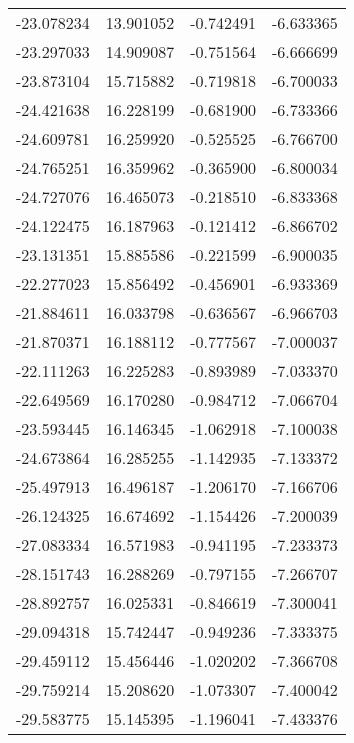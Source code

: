 \begin{tabular}{rrrr}
      -23.078234 &        13.901052 &   -0.742491 &  -6.633365 \\
      -23.297033 &        14.909087 &   -0.751564 &  -6.666699 \\
      -23.873104 &        15.715882 &   -0.719818 &  -6.700033 \\
      -24.421638 &        16.228199 &   -0.681900 &  -6.733366 \\
      -24.609781 &        16.259920 &   -0.525525 &  -6.766700 \\
      -24.765251 &        16.359962 &   -0.365900 &  -6.800034 \\
      -24.727076 &        16.465073 &   -0.218510 &  -6.833368 \\
      -24.122475 &        16.187963 &   -0.121412 &  -6.866702 \\
      -23.131351 &        15.885586 &   -0.221599 &  -6.900035 \\
      -22.277023 &        15.856492 &   -0.456901 &  -6.933369 \\
      -21.884611 &        16.033798 &   -0.636567 &  -6.966703 \\
      -21.870371 &        16.188112 &   -0.777567 &  -7.000037 \\
      -22.111263 &        16.225283 &   -0.893989 &  -7.033370 \\
      -22.649569 &        16.170280 &   -0.984712 &  -7.066704 \\
      -23.593445 &        16.146345 &   -1.062918 &  -7.100038 \\
      -24.673864 &        16.285255 &   -1.142935 &  -7.133372 \\
      -25.497913 &        16.496187 &   -1.206170 &  -7.166706 \\
      -26.124325 &        16.674692 &   -1.154426 &  -7.200039 \\
      -27.083334 &        16.571983 &   -0.941195 &  -7.233373 \\
      -28.151743 &        16.288269 &   -0.797155 &  -7.266707 \\
      -28.892757 &        16.025331 &   -0.846619 &  -7.300041 \\
      -29.094318 &        15.742447 &   -0.949236 &  -7.333375 \\
      -29.459112 &        15.456446 &   -1.020202 &  -7.366708 \\
      -29.759214 &        15.208620 &   -1.073307 &  -7.400042 \\
      -29.583775 &        15.145395 &   -1.196041 &  -7.433376 \\

\end{tabular}
